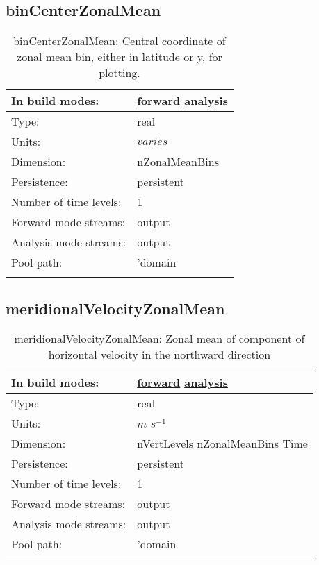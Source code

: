 \subsection[binCenterZonalMean]{binCenterZonalMean}
\label{subsec:var_sec_amZonalMean_binCenterZonalMean}
\begin{center}
\begin{longtable}{| p{2.0in} | p{4.0in} |}
        \hline 
        In build modes: & \hyperref[subsec:forward_var_tab_amZonalMean]{forward} \hyperref[subsec:analysis_var_tab_amZonalMean]{analysis} \\
        \hline 
        Type: & real \\
        \hline 
        Units: & $varies$ \\
        \hline 
        Dimension: & nZonalMeanBins \\
        \hline 
        Persistence: & persistent \\
        \hline 
        Number of time levels: & 1 \\
        \hline 
		 Forward mode streams: &  output \\
        \hline 
		 Analysis mode streams: &  output \\
        \hline 
            Pool path: & 'domain %
 \\
		 \hline 
    \caption{binCenterZonalMean: Central coordinate of zonal mean bin, either in latitude or y, for plotting.}
\end{longtable}
\end{center}
\subsection[meridionalVelocityZonalMean]{meridionalVelocityZonalMean}
\label{subsec:var_sec_amZonalMean_meridionalVelocityZonalMean}
\begin{center}
\begin{longtable}{| p{2.0in} | p{4.0in} |}
        \hline 
        In build modes: & \hyperref[subsec:forward_var_tab_amZonalMean]{forward} \hyperref[subsec:analysis_var_tab_amZonalMean]{analysis} \\
        \hline 
        Type: & real \\
        \hline 
        Units: & $m$ $s^{-1}$ \\
        \hline 
        Dimension: & nVertLevels nZonalMeanBins Time \\
        \hline 
        Persistence: & persistent \\
        \hline 
        Number of time levels: & 1 \\
        \hline 
		 Forward mode streams: &  output \\
        \hline 
		 Analysis mode streams: &  output \\
        \hline 
            Pool path: & 'domain %
 \\
		 \hline 
    \caption{meridionalVelocityZonalMean: Zonal mean of component of horizontal velocity in the northward direction}
\end{longtable}
\end{center}
